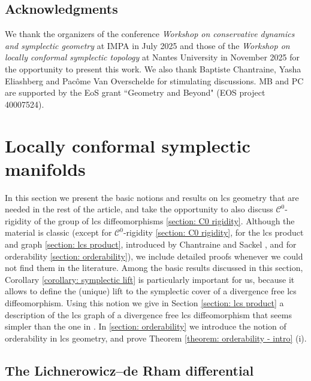 \documentclass{amsart}
\theoremstyle{remark}
\begin{document}
\subsection*{Acknowledgments} 
We thank the organizers of the conference
\textit{Workshop on conservative dynamics and symplectic geometry} 
at IMPA in July 2025 and those of the \textit{Workshop on locally conformal symplectic topology} at Nantes University in November 2025
for the opportunity to present this work.
We also thank Baptiste Chantraine, Yasha Eliashberg and Pacôme Van Overschelde for stimulating discussions. MB and PC are supported by the EoS grant ``Geometry and Beyond" (EOS project 40007524). 







\section{Locally conformal symplectic manifolds}\label{section: lcs manifolds}

In this section we present
the basic notions and results on lcs geometry
that are needed in the rest of the article,
and take the opportunity
to also discuss $\mathcal{C}^0$-rigidity
of the group of lcs diffeomorphisms
\ref{section: C0 rigidity}.
Although the material is classic
(except for $\mathcal{C}^0$-rigidity
\ref{section: C0 rigidity},
for the lcs product and graph \ref{section: lcs product},
introduced by Chantraine and Sackel \cite{CS},
and for orderability \ref{section: orderability}),
we include detailed proofs
whenever we could not find them in the literature.
Among the basic results discussed in this section,
Corollary \ref{corollary: symplectic lift}
is particularly important for us,
because it allows to define
the (unique) lift to the symplectic cover
of a divergence free lcs diffeomorphism.
Using this notion we give in Section \ref{section: lcs product}
a description of the lcs graph of a divergence free lcs diffeomorphism
that seems simpler than the one in \cite{CS}.
In \ref{section: orderability}
we introduce the notion of orderability in lcs geometry,
and prove Theorem \ref{theorem: orderability - intro} (i).

\subsection{The Lichnerowicz--de Rham differential}
\end{document}
